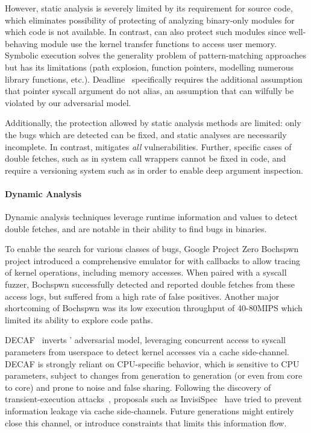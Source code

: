 \documentclass[letterpaper,twocolumn,10pt]{article}
\begin{document}
However, static analysis is severely limited by its requirement for
source code, which eliminates possibility of protecting of analyzing
binary-only modules for which code is not available.
In contrast, \midas can also protect such modules since well-behaving
module use the kernel transfer functions to access user memory.
Symbolic execution solves the generality problem of pattern-matching
approaches but has its limitations (path explosion, function pointers,
modelling numerous library functions, etc.).
Deadline~\cite{deadline} specifically requires the additional assumption
that pointer syscall argument do not alias, an assumption that can
wilfully be violated by our adversarial model.

Additionally, the protection allowed by static analysis methods are
limited: only the bugs which are detected can be fixed, and static
analyses are necessarily incomplete.
In contrast, \midas mitigates \emph{all} \tocttou vulnerabilities.
Further, specific cases of double fetches, such as in system call wrappers
cannot be fixed in code, and require a versioning system such as
\midas in order to enable deep argument inspection.

\paragraph{Dynamic Analysis}
%
Dynamic analysis techniques leverage runtime information and values
to detect double fetches, and are notable in their ability to
find bugs in binaries.

To enable the search for various classes of bugs, Google Project Zero
Bochspwn~\cite{jurczyk2013bochspwn} project introduced
a comprehensive emulator for  with callbacks to allow
tracing of kernel operations, including memory accesses.
When paired with a syscall fuzzer,
Bochspwn successfully detected and reported double fetches from
these access logs, but suffered from a high rate of false positives.
Another major shortcoming of Bochspwn was its low execution throughput
of 40-80MIPS which limited its ability to explore code paths.

DECAF~\cite{schwartzDECAF} inverts \midas' adversarial model, leveraging
concurrent access to syscall parameters from userspace to detect kernel
accesses via a cache side-channel.
DECAF is strongly reliant on CPU-specific behavior, which
is sensitive to CPU parameters, subject to changes from generation to
generation (or even from core to core) and prone to noise and false sharing.
Following the discovery of transient-execution attacks~\cite{kocher18spectre},
proposals such as InvisiSpec~\cite{YanInvisispec,KhasawnehKSEPA19} have
tried to prevent
information leakage via cache side-channels.
Future generations might entirely close this channel, or introduce constraints
that limits this information flow.
\end{document}
